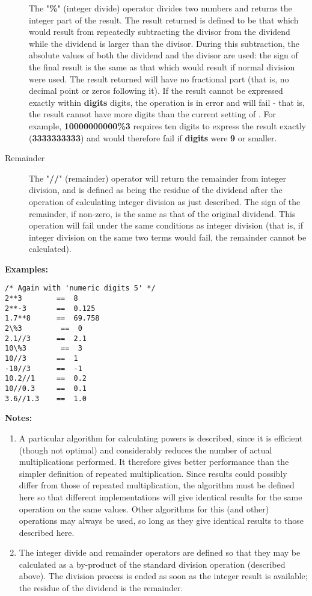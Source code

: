 \begin{description}

The "\textbf{\%}" (integer divide) operator divides two numbers
and returns the integer part of the result.
The result returned is defined to be that which would result from
repeatedly subtracting the divisor from the dividend while the dividend
is larger than the divisor.  During this subtraction, the absolute
values of both the dividend and the divisor are used: the sign of the
final result is the same as that which would result if normal division
were used.
 The result returned will have no fractional part (that is, no
decimal point or zeros following it).
If the result cannot be expressed exactly within \textbf{digits}
digits, the operation is in error and will fail - that is, the
result cannot have more digits than the current setting of .
For example, \textbf{10000000000\%3} requires ten digits to express the
result exactly (\textbf{3333333333}) and would therefore fail
if \textbf{digits} were \textbf{9} or smaller.
\item[Remainder]

The "\textbf{//}" (remainder) operator will return the remainder
from integer division, and is defined
as being the residue of the dividend after the operation of calculating
integer division as just described.
The sign of the remainder, if non-zero, is the same as that of the
original dividend.
 This operation will fail under the same conditions as integer
division (that is, if integer division on the same two terms would
fail, the remainder cannot be calculated).
\end{description}
 \textbf{Examples:}
\begin{lstlisting}
/* Again with 'numeric digits 5' */
2**3        ==  8
2**-3       ==  0.125
1.7**8      ==  69.758
2\%3         ==  0
2.1//3      ==  2.1
10\%3        ==  3
10//3       ==  1
-10//3      ==  -1
10.2//1     ==  0.2
10//0.3     ==  0.1
3.6//1.3    ==  1.0
\end{lstlisting}
 \textbf{Notes:}
\begin{enumerate}
\item A particular algorithm for calculating powers is described, since
it is efficient (though not optimal) and considerably reduces the
number of actual multiplications performed.
It therefore gives better performance than the simpler definition of
repeated multiplication.
Since results could possibly differ from those of repeated
multiplication, the algorithm must be defined here so that different
implementations will give identical results for the same operation on
the same values.
Other algorithms for this (and other) operations may always be used, so
long as they give identical results to those described here.
\item The integer divide and remainder operators are defined so that they
may be calculated as a by-product of the standard division operation
(described above).  The division process is ended as soon as the
integer result is available; the residue of the dividend is the
remainder.
\end{enumerate}
